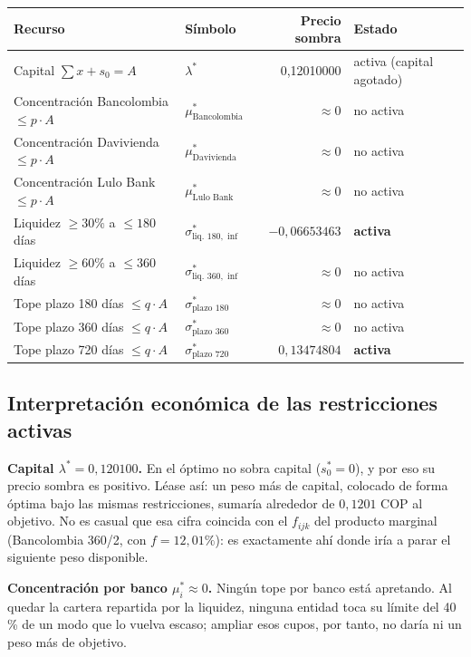 \documentclass[11pt,a4paper]{article}
\begin{document}
\begin{center}
\small
\begin{tabularx}{\textwidth}{L l r l}
\toprule
Recurso & Símbolo & Precio sombra & Estado \\
\midrule
Capital $\sum x + s_0 = A$ & $\lambda^*$ & 0,12010000 & activa (capital agotado) \\
Concentración Bancolombia $\le p\cdot A$ & $\mu^*_{\text{Bancolombia}}$ & $\approx 0$ & no activa \\
Concentración Davivienda $\le p\cdot A$ & $\mu^*_{\text{Davivienda}}$ & $\approx 0$ & no activa \\
Concentración Lulo Bank $\le p\cdot A$ & $\mu^*_{\text{Lulo Bank}}$ & $\approx 0$ & no activa \\
Liquidez $\ge 30\%$ a $\le 180$ días & $\sigma^*_{\text{liq. }180,\text{ inf}}$ & $-0{,}06653463$ & \textbf{activa} \\
Liquidez $\ge 60\%$ a $\le 360$ días & $\sigma^*_{\text{liq. }360,\text{ inf}}$ & $\approx 0$ & no activa \\
Tope plazo 180 días $\le q\cdot A$ & $\sigma^*_{\text{plazo }180}$ & $\approx 0$ & no activa \\
Tope plazo 360 días $\le q\cdot A$ & $\sigma^*_{\text{plazo }360}$ & $\approx 0$ & no activa \\
Tope plazo 720 días $\le q\cdot A$ & $\sigma^*_{\text{plazo }720}$ & $0{,}13474804$ & \textbf{activa} \\
\bottomrule
\end{tabularx}
\end{center}

\subsection{Interpretación económica de las restricciones activas}

\textbf{Capital $\lambda^* = 0{,}120100$.} En el óptimo no sobra capital ($s_0^* = 0$), y por
eso su precio sombra es positivo. Léase así: un peso más de capital, colocado de forma óptima
bajo las mismas restricciones, sumaría alrededor de $0{,}1201$ COP al objetivo. No es casual
que esa cifra coincida con el $f_{ijk}$ del producto marginal (Bancolombia 360/2, con $f =
12{,}01\%$): es exactamente ahí donde iría a parar el siguiente peso disponible.

\textbf{Concentración por banco $\mu_i^* \approx 0$.} Ningún tope por banco está apretando. Al
quedar la cartera repartida por la liquidez, ninguna entidad toca su límite del 40\,\% de un
modo que lo vuelva escaso; ampliar esos cupos, por tanto, no daría ni un peso más de objetivo.
\end{document}
